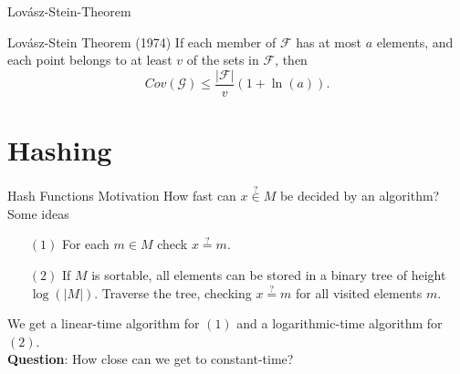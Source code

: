 \documentclass[10pt]{beamer}
\begin{document}
\begin{frame}[fragile]{Lovász-Stein-Theorem}
    \begin{block}{Lovász-Stein Theorem (1974)}
        If each member of $ \mathcal{F} $ has at most $ a $ elements,
        and each point belongs to at least $ v $ of the sets in $ \mathcal{F} $, then
        \[
            Cov(\mathcal{G}) \leq \frac{|\mathcal{F}|}{v}(1 + \ln(a)).
        \]
    \end{block}
\end{frame}

\section{Hashing}

\begin{frame}[fragile]{Hash Functions Motivation}
    How fast can $ x \stackrel{?}{\in} M $ be decided by an algorithm? \pause
    \\
    \vspace{1em}
    Some ideas
    \begin{itemize}
        \item[$ (1) $] For each $ m \in M $ check $ x \stackrel{?}{=} m $.\pause
        \item[$ (2) $] If $ M $ is sortable, all elements can be stored in a binary tree of height $ \log (|M|)$.
        Traverse the tree, checking $ x \stackrel{?}{=} m $ for all visited elements $ m $.\pause
    \end{itemize}
    We get a linear-time algorithm for $ (1) $ and a logarithmic-time algorithm for $ (2) $.\pause
    \\
    \vfill
    \textbf{Question}: How close can we get to constant-time?
\end{frame}
\end{document}
